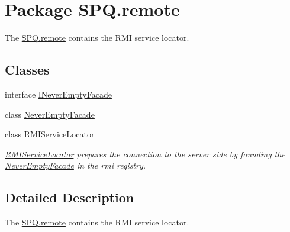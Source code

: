 \hypertarget{namespace_s_p_q_1_1remote}{}\section{Package S\+P\+Q.\+remote}
\label{namespace_s_p_q_1_1remote}


The \mbox{\hyperlink{namespace_s_p_q_1_1remote}{S\+P\+Q.\+remote}} contains the R\+MI service locator.  


\subsection*{Classes}
\begin{DoxyCompactItemize}
\item 
interface \mbox{\hyperlink{interface_s_p_q_1_1remote_1_1_i_never_empty_facade}{I\+Never\+Empty\+Facade}}
\item 
class \mbox{\hyperlink{class_s_p_q_1_1remote_1_1_never_empty_facade}{Never\+Empty\+Facade}}
\item 
class \mbox{\hyperlink{class_s_p_q_1_1remote_1_1_r_m_i_service_locator}{R\+M\+I\+Service\+Locator}}
\begin{DoxyCompactList}\small\item\em \mbox{\hyperlink{class_s_p_q_1_1remote_1_1_r_m_i_service_locator}{R\+M\+I\+Service\+Locator}} prepares the connection to the server side by founding the \mbox{\hyperlink{class_s_p_q_1_1remote_1_1_never_empty_facade}{Never\+Empty\+Facade}} in the rmi registry. \end{DoxyCompactList}\end{DoxyCompactItemize}


\subsection{Detailed Description}
The \mbox{\hyperlink{namespace_s_p_q_1_1remote}{S\+P\+Q.\+remote}} contains the R\+MI service locator. 